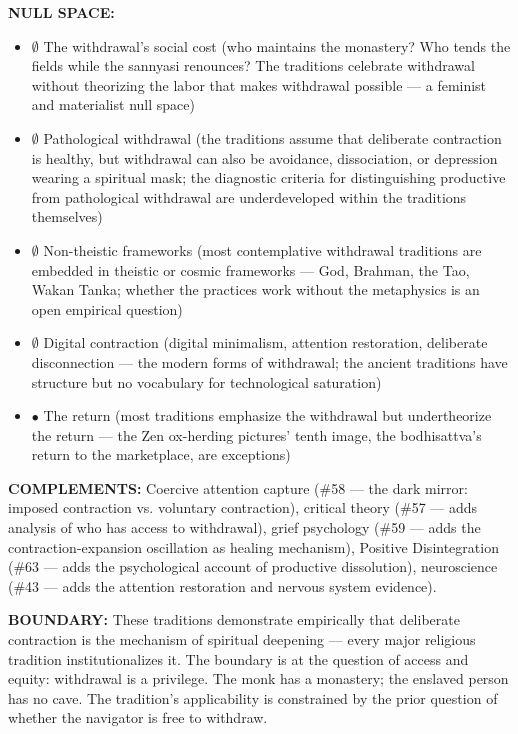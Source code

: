 \textbf{NULL SPACE:}

\begin{itemize}[nosep,leftmargin=*]
  \item $\emptyset$ The withdrawal's social cost (who maintains the monastery? Who tends the fields while the sannyasi renounces? The traditions celebrate withdrawal without theorizing the labor that makes withdrawal possible — a feminist and materialist null space)
  \item $\emptyset$ Pathological withdrawal (the traditions assume that deliberate contraction is healthy, but withdrawal can also be avoidance, dissociation, or depression wearing a spiritual mask; the diagnostic criteria for distinguishing productive from pathological withdrawal are underdeveloped within the traditions themselves)
  \item $\emptyset$ Non-theistic frameworks (most contemplative withdrawal traditions are embedded in theistic or cosmic frameworks — God, Brahman, the Tao, Wakan Tanka; whether the practices work without the metaphysics is an open empirical question)
  \item $\emptyset$ Digital contraction (digital minimalism, attention restoration, deliberate disconnection — the modern forms of withdrawal; the ancient traditions have structure but no vocabulary for technological saturation)
  \item $\bullet$ The return (most traditions emphasize the withdrawal but undertheorize the return — the Zen ox-herding pictures' tenth image, the bodhisattva's return to the marketplace, are exceptions)
\end{itemize}


\textbf{COMPLEMENTS:} Coercive attention capture (\#58 — the dark mirror: imposed contraction vs. voluntary contraction), critical theory (\#57 — adds analysis of who has access to withdrawal), grief psychology (\#59 — adds the contraction-expansion oscillation as healing mechanism), Positive Disintegration (\#63 — adds the psychological account of productive dissolution), neuroscience (\#43 — adds the attention restoration and nervous system evidence).


\textbf{BOUNDARY:} These traditions demonstrate empirically that deliberate contraction is the mechanism of spiritual deepening — every major religious tradition institutionalizes it. The boundary is at the question of access and equity: withdrawal is a privilege. The monk has a monastery; the enslaved person has no cave. The tradition's applicability is constrained by the prior question of whether the navigator is free to withdraw.


